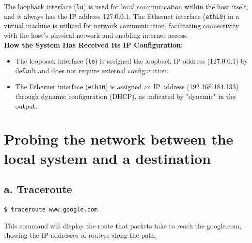 \documentclass{report}
\begin{document}
The loopback interface (\texttt{lo}) is used for local communication within the host itself, and it always has the IP address 127.0.0.1.
The Ethernet interface (\texttt{eth10}) in a virtual machine is utilized for network communication,
facilitating connectivity with the host's physical network and enabling internet access.\cite{5} \\

\textbf{How the System Has Received Its IP Configuration:}
\begin{itemize}
  \item The loopback interface (\texttt{lo}) is assigned the loopback IP address (127.0.0.1) by default and does not require external configuration.
  \item The Ethernet interface (\texttt{eth10}) is assigned an IP address (192.168.184.133) through dynamic configuration (DHCP), as indicated by "dynamic" in the output. 
\end{itemize}


\section*{Probing the network between the local system and a destination}

\subsection*{a. Traceroute}

\begin{lstlisting}[language=bash]
  $ traceroute www.google.com
\end{lstlisting}

This command will display the route that packets take to reach the google.com, showing the IP addresses of routers along the path.
\end{document}
